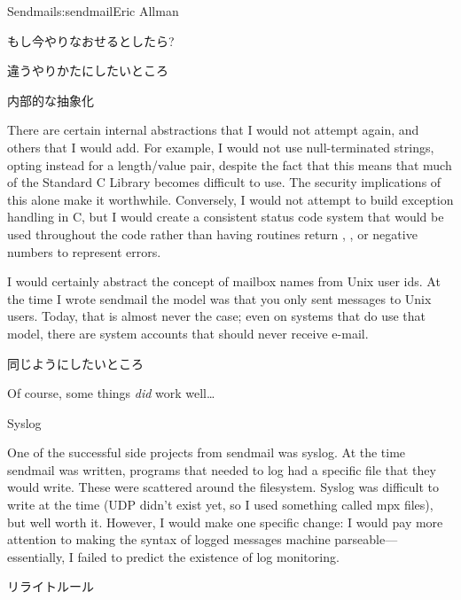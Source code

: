 \begin{aosachapter}{Sendmail}{s:sendmail}{Eric Allman}
\begin{aosasect1}{もし今やりなおせるとしたら?}
\begin{aosasect2}{違うやりかたにしたいところ}
\begin{aosasect3}{内部的な抽象化}

There are certain internal abstractions that I would not attempt
again, and others that I would add. For example, I would not use
null-terminated strings, opting instead for a length/value pair,
despite the fact that this means that much of the Standard C Library
becomes difficult to use. The security implications of this alone make
it worthwhile. Conversely, I would not attempt to build exception
handling in C, but I would create a consistent status code system that
would be used throughout the code rather than having routines return
, , or negative numbers to represent errors.

I would certainly abstract the concept of mailbox names from Unix user
ids. At the time I wrote sendmail the model was that you only sent
messages to Unix users. Today, that is almost never the case; even on
systems that do use that model, there are system accounts that should
never receive e-mail.

\end{aosasect3}

\end{aosasect2}

\begin{aosasect2}{同じようにしたいところ}

Of course, some things \emph{did} work well\ldots

\begin{aosasect3}{Syslog}

One of the successful side projects from sendmail was syslog. At the
time sendmail was written, programs that needed to log had a specific
file that they would write. These were scattered around the
filesystem.  Syslog was difficult to write at the time (UDP didn't
exist yet, so I used something called mpx files), but well worth
it. However, I would make one specific change: I would pay more
attention to making the syntax
of logged messages
machine parseable---essentially, I
failed to predict the existence of log monitoring.

\end{aosasect3}

\begin{aosasect3}{リライトルール}


\end{aosasect3}
\end{aosasect2}
\end{aosasect1}
\end{aosachapter}
